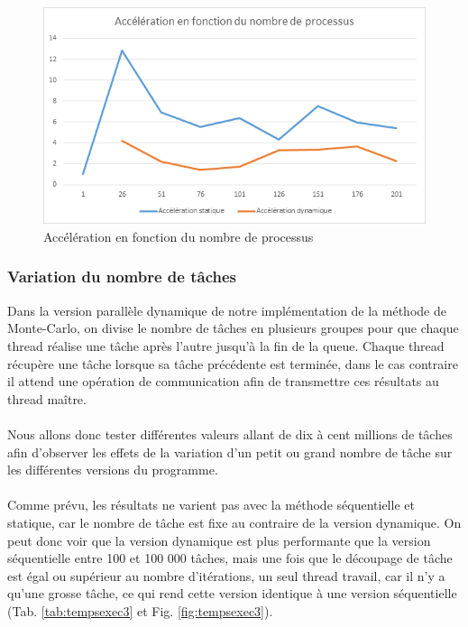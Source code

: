 \documentclass[a4paper,12pt]{article}
\begin{document}
\begin{figure}[H]
\center \includegraphics[width=15cm]{acc2} %
\caption{Accélération en fonction du nombre de processus}
\label{fig:acc2}
\end{figure}

\vspace{0.5cm}
\subsubsection{Variation du nombre de tâches}
Dans la version parallèle dynamique de notre implémentation de la méthode de Monte-Carlo, on divise le nombre de tâches en plusieurs groupes pour que chaque thread réalise une tâche après l'autre jusqu'à la fin de la queue. Chaque thread récupère une tâche lorsque sa tâche précédente est terminée, dans le cas contraire il attend une opération de communication afin de transmettre ces résultats au thread maître. \\\\
\indent Nous allons donc tester différentes valeurs allant de dix à cent millions de tâches afin d'observer les effets de la variation d'un petit ou grand nombre de tâche sur les différentes versions du programme.\\\\
\indent Comme prévu, les résultats ne varient pas avec la méthode séquentielle et statique, car le nombre de tâche est fixe au contraire de la version dynamique. On peut donc voir que la version dynamique est plus performante que la version séquentielle entre 100 et 100 000 tâches, mais une fois que le découpage de tâche est égal ou supérieur au nombre d'itérations, un seul thread travail, car il n'y a qu'une grosse tâche, ce qui rend cette version identique à une version séquentielle (Tab. \ref{tab:tempsexec3} et Fig. \ref{fig:tempsexec3}). 
\end{document}
